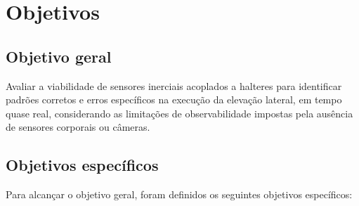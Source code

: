 \section{Objetivos}

\subsection{Objetivo geral}

Avaliar a viabilidade de sensores inerciais acoplados a halteres para
identificar padrões corretos e erros específicos na execução da elevação
lateral, em tempo quase real, considerando as limitações de observabilidade
impostas pela ausência de sensores corporais ou câmeras.

\subsection{Objetivos específicos}

Para alcançar o objetivo geral, foram definidos os seguintes objetivos específicos:

